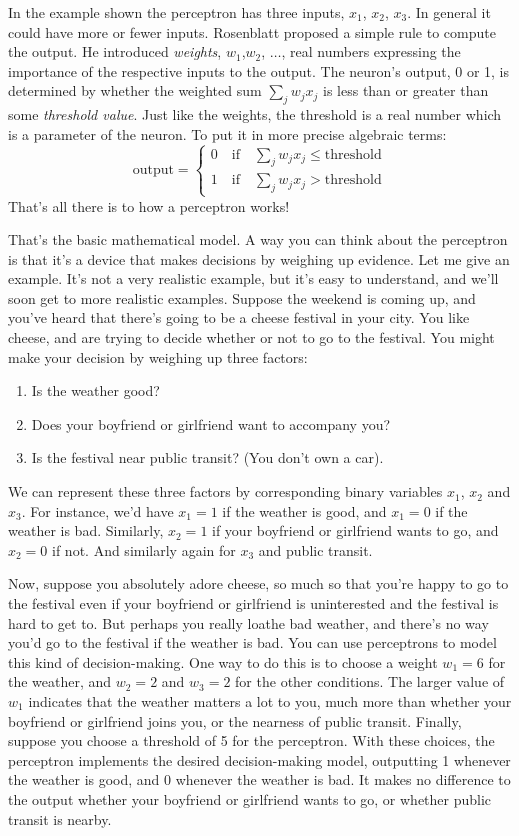 \documentclass[a4paper,twoside,10pt]{book}
\begin{document}
In the example shown the perceptron has three inputs, $x_1$, $x_2$, $x_3$. In general it could have more or fewer inputs. Rosenblatt proposed a simple rule to compute the output. He introduced \textit{weights}, $w_1$,$w_2$, $\ldots$, real numbers expressing the importance of the respective inputs to the output. The neuron's output, 0 or 1, is determined by whether the weighted sum  $\sum_j w_jx_j$ is less than or greater than some \textit{threshold value}. Just like the weights, the threshold is a real number which is a parameter of the neuron. To put it in more precise algebraic terms:
\begin{equation}
\textrm{output} = \begin{cases}
0 \quad \textrm{if}\quad \sum_j w_jx_j \le \mathrm{threshold} \\
1 \quad \textrm{if}\quad \sum_j w_jx_j > \mathrm{threshold}
\end{cases}
\end{equation}
That's all there is to how a perceptron works!

That's the basic mathematical model. A way you can think about the perceptron is that it's a device that makes decisions by weighing up evidence. Let me give an example. It's not a very realistic example, but it's easy to understand, and we'll soon get to more realistic examples. Suppose the weekend is coming up, and you've heard that there's going to be a cheese festival in your city. You like cheese, and are trying to decide whether or not to go to the festival. You might make your decision by weighing up three factors:
\begin{enumerate}
	\item Is the weather good?
	\item Does your boyfriend or girlfriend want to accompany you?
	\item Is the festival near public transit? (You don't own a car).
\end{enumerate}
We can represent these three factors by corresponding binary variables $x_1$, $x_2$ and $x_3$. For instance, we'd have $x_1=1$ if the weather is good, and $x_1=0$ if the weather is bad. Similarly, $x_2=1$ if your boyfriend or girlfriend wants to go, and $x_2=0$ if not. And similarly again for $x_3$ and public transit.

Now, suppose you absolutely adore cheese, so much so that you're happy to go to the festival even if your boyfriend or girlfriend is uninterested and the festival is hard to get to. But perhaps you really loathe bad weather, and there's no way you'd go to the festival if the weather is bad. You can use perceptrons to model this kind of decision-making. One way to do this is to choose a weight $w_1=6$ for the weather, and $w_2=2$ and $w_3=2$ for the other conditions. The larger value of $w_1$ indicates that the weather matters a lot to you, much more than whether your boyfriend or girlfriend joins you, or the nearness of public transit. Finally, suppose you choose a threshold of 5 for the perceptron. With these choices, the perceptron implements the desired decision-making model, outputting 1 whenever the weather is good, and 0 whenever the weather is bad. It makes no difference to the output whether your boyfriend or girlfriend wants to go, or whether public transit is nearby.
\end{document}
